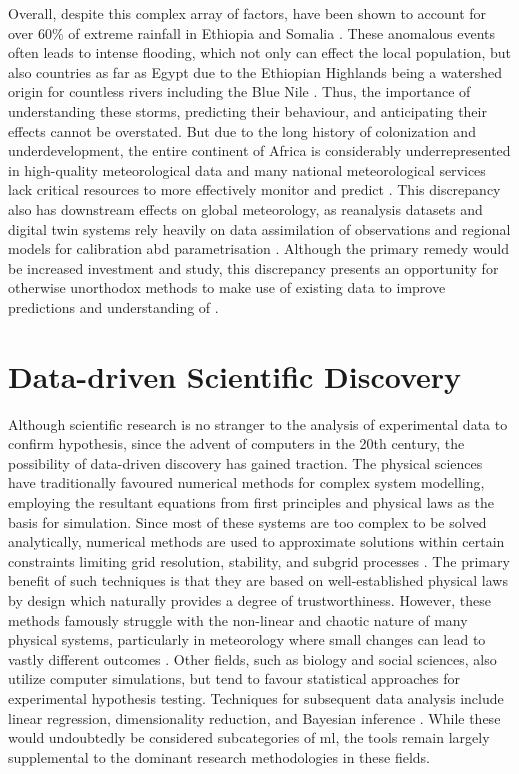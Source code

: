 Overall, despite this complex array of factors,  have been shown to account for over 60\% of extreme rainfall in Ethiopia and Somalia \citep{Hill2023}. These anomalous events often leads to intense flooding, which not only can effect the local population, but also countries as far as Egypt due to the Ethiopian Highlands being a watershed origin for countless rivers including the Blue Nile \citep{Legese2020,Zaroug2014}. Thus, the importance of understanding these storms, predicting their behaviour, and anticipating their effects cannot be overstated. But due to the long history of colonization and underdevelopment, the entire continent of Africa is considerably underrepresented in high-quality meteorological data and many national meteorological services lack critical resources to more effectively monitor and predict  \citep{Dinku2019,Kinyondo2018,Meque2021}. This discrepancy also has downstream effects on global meteorology, as reanalysis datasets and digital twin systems rely heavily on data assimilation of observations and regional models for calibration abd parametrisation \citep{Linsenmeier2023,Valmassoi2023}. Although the primary remedy would be increased investment and study, this discrepancy presents an opportunity for otherwise unorthodox methods to make use of existing data to improve predictions and understanding of .

\section{Data-driven Scientific Discovery}

Although scientific research is no stranger to the analysis of experimental data to confirm hypothesis, since the advent of computers in the 20th century, the possibility of data-driven discovery has gained traction. The physical sciences have traditionally favoured numerical methods for complex system modelling, employing the resultant equations from first principles and physical laws as the basis for simulation. Since most of these systems are too complex to be solved analytically, numerical methods are used to approximate solutions within certain constraints limiting grid resolution, stability, and subgrid processes \citep{Lynch2008}. The primary benefit of such techniques is that they are based on well-established physical laws by design which naturally provides a degree of trustworthiness. However, these methods famously struggle with the non-linear and chaotic nature of many physical systems, particularly in meteorology where small changes can lead to vastly different outcomes \citep{Lorenz1963}. Other fields, such as biology and social sciences, also utilize computer simulations, but tend to favour statistical approaches for experimental hypothesis testing. Techniques for subsequent data analysis include linear regression, dimensionality reduction, and Bayesian inference \citep{Ackermann2011,Weinstein2010}. While these would undoubtedly be considered subcategories of \acrshort{ml}, the tools remain largely supplemental to the dominant research methodologies in these fields.

